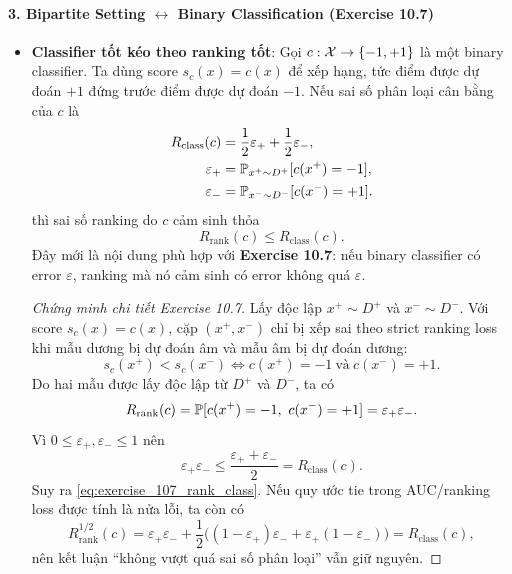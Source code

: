 \paragraph{3. Bipartite Setting $\leftrightarrow$ Binary Classification (Exercise 10.7)}
\begin{itemize}
    \item \textbf{Classifier tốt kéo theo ranking tốt}: Gọi $c:\mathcal{X}\to\{-1,+1\}$ là một binary classifier. Ta dùng score $s_c(x)=c(x)$ để xếp hạng, tức điểm được dự đoán $+1$ đứng trước điểm được dự đoán $-1$. Nếu sai số phân loại cân bằng của $c$ là
    \[
        \begin{aligned}
        R_{\mathrm{class}}(c)
        &=
        \frac{1}{2}\varepsilon_+ + \frac{1}{2}\varepsilon_-,\\
        \varepsilon_+
        &=
        \mathbb{P}_{x^+\sim D^+}[c(x^+)=-1],\\
        \varepsilon_-
        &=
        \mathbb{P}_{x^-\sim D^-}[c(x^-) = +1].
        \end{aligned}
    \]
    thì sai số ranking do $c$ cảm sinh thỏa
    \begin{equation}
        R_{\mathrm{rank}}(c) \leq R_{\mathrm{class}}(c).
        \label{eq:exercise_107_rank_class}
    \end{equation}
    Đây mới là nội dung phù hợp với \textbf{Exercise 10.7}: nếu binary classifier có error $\varepsilon$, ranking mà nó cảm sinh có error không quá $\varepsilon$.

    \begin{proof}[Chứng minh chi tiết Exercise 10.7]
    Lấy độc lập $x^+\sim D^+$ và $x^-\sim D^-$. Với score $s_c(x)=c(x)$, cặp $(x^+,x^-)$ chỉ bị xếp sai theo strict ranking loss khi mẫu dương bị dự đoán âm và mẫu âm bị dự đoán dương:
    \[
        s_c(x^+) < s_c(x^-)
        \Longleftrightarrow
        c(x^+)=-1 \ \text{và}\ c(x^-)=+1.
    \]
    Do hai mẫu được lấy độc lập từ $D^+$ và $D^-$, ta có
    \[
        R_{\mathrm{rank}}(c)
        =
        \mathbb{P}[c(x^+)=-1,\ c(x^-)=+1]
        =
        \varepsilon_+\varepsilon_-.
    \]
    Vì $0\leq \varepsilon_+,\varepsilon_-\leq 1$ nên
    \[
        \varepsilon_+\varepsilon_-
        \leq
        \frac{\varepsilon_+ + \varepsilon_-}{2}
        =
        R_{\mathrm{class}}(c).
    \]
    Suy ra \eqref{eq:exercise_107_rank_class}. Nếu quy ước tie trong AUC/ranking loss được tính là nửa lỗi, ta còn có
    \[
        R_{\mathrm{rank}}^{1/2}(c)
        =
        \varepsilon_+\varepsilon_-
        +
        \frac{1}{2}\big((1-\varepsilon_+)\varepsilon_-+\varepsilon_+(1-\varepsilon_-)\big)
        =
        R_{\mathrm{class}}(c),
    \]
    nên kết luận ``không vượt quá sai số phân loại'' vẫn giữ nguyên.


\end{proof}
\end{itemize}
